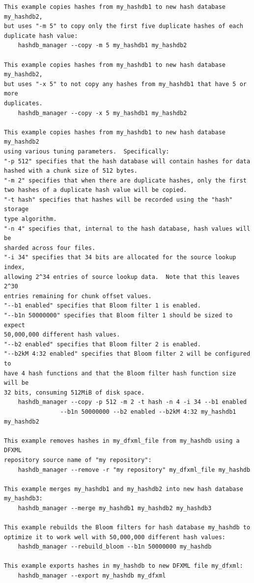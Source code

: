 \documentclass[11pt,twoside]{article}
\begin{document}
\begin{small}
\begin{verbatim}
This example copies hashes from my_hashdb1 to new hash database my_hashdb2,
but uses "-m 5" to copy only the first five duplicate hashes of each
duplicate hash value:
    hashdb_manager --copy -m 5 my_hashdb1 my_hashdb2

This example copies hashes from my_hashdb1 to new hash database my_hashdb2,
but uses "-x 5" to not copy any hashes from my_hashdb1 that have 5 or more
duplicates.
    hashdb_manager --copy -x 5 my_hashdb1 my_hashdb2

This example copies hashes from my_hashdb1 to new hash database my_hashdb2
using various tuning parameters.  Specifically:
"-p 512" specifies that the hash database will contain hashes for data
hashed with a chunk size of 512 bytes.
"-m 2" specifies that when there are duplicate hashes, only the first
two hashes of a duplicate hash value will be copied.
"-t hash" specifies that hashes will be recorded using the "hash" storage
type algorithm.
"-n 4" specifies that, internal to the hash database, hash values will be
sharded across four files.
"-i 34" specifies that 34 bits are allocated for the source lookup index,
allowing 2^34 entries of source lookup data.  Note that this leaves 2^30
entries remaining for chunk offset values.
"--b1 enabled" specifies that Bloom filter 1 is enabled.
"--b1n 50000000" specifies that Bloom filter 1 should be sized to expect
50,000,000 different hash values.
"--b2 enabled" specifies that Bloom filter 2 is enabled.
"--b2kM 4:32 enabled" specifies that Bloom filter 2 will be configured to
have 4 hash functions and that the Bloom filter hash function size will be
32 bits, consuming 512MiB of disk space.
    hashdb_manager --copy -p 512 -m 2 -t hash -n 4 -i 34 --b1 enabled
                --b1n 50000000 --b2 enabled --b2kM 4:32 my_hashdb1 my_hashdb2

This example removes hashes in my_dfxml_file from my_hashdb using a DFXML
repository source name of "my repository":
    hashdb_manager --remove -r "my repository" my_dfxml_file my_hashdb

This example merges my_hashdb1 and my_hashdb2 into new hash database
my_hashdb3:
    hashdb_manager --merge my_hashdb1 my_hashdb2 my_hashdb3

This example rebuilds the Bloom filters for hash database my_hashdb to
optimize it to work well with 50,000,000 different hash values:
    hashdb_manager --rebuild_bloom --b1n 50000000 my_hashdb

This example exports hashes in my_hashdb to new DFXML file my_dfxml:
    hashdb_manager --export my_hashdb my_dfxml


\end{verbatim}
\end{small}
\end{document}
